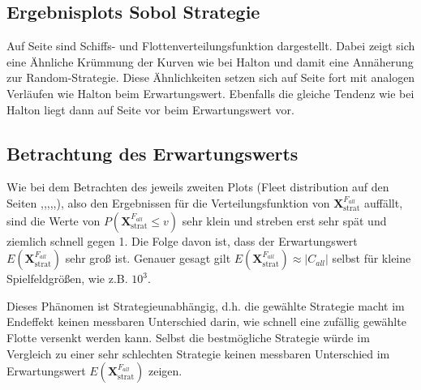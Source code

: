 \documentclass[a4paper,12pt]{llncs}
\numberwithin{equation}{section}
\DeclareMathOperator{\strat}{strat}
\begin{document}
\subsection{Ergebnisplots Sobol Strategie}

\begin{landscape}
	\label{fig:sobol1}
	
\end{landscape}

\begin{landscape}
	\label{fig:sobol2}
	
\end{landscape}

\begin{landscape}
	\label{fig:sobol3}
	
\end{landscape}

Auf Seite \pageref{fig:sobol1} sind Schiffs- und Flottenverteilungsfunktion dargestellt. Dabei zeigt sich eine Ähnliche Krümmung der Kurven wie bei Halton und damit eine Annäherung zur Random-Strategie. Diese Ähnlichkeiten setzen sich auf Seite \pageref{fig:sobol2} fort mit analogen Verläufen wie Halton beim Erwartungswert. Ebenfalls die gleiche Tendenz wie bei Halton liegt dann auf Seite \pageref{fig:sobol3} vor beim Erwartungswert vor.

\subsection{Betrachtung des Erwartungswerts}

Wie bei dem Betrachten des jeweils zweiten Plots (Fleet distribution auf den Seiten \pageref{fig:random1},\pageref{fig:fullGrid1},\pageref{fig:sparseGrid1},\pageref{fig:halton1},\pageref{fig:sobol1},\pageref{fig:compare1}), also den Ergebnissen für die Verteilungsfunktion von $\mathbf{X}^{F_{all}}_{\strat}$ auffällt, sind die Werte von $P(\mathbf{X}^{F_{all}}_{\strat} \leq v)$ sehr klein und streben erst sehr spät und ziemlich schnell gegen 1. Die Folge davon ist, dass der Erwartungswert $E(\mathbf{X}^{F_{all}}_{\strat})$ sehr groß ist. Genauer gesagt gilt $E(\mathbf{X}^{F_{all}}_{\strat}) \approx |C_{all}|$ selbst für kleine Spielfeldgrößen, wie z.B. $10^3$.

Dieses Phänomen ist Strategieunabhängig, d.h. die gewählte Strategie macht im Endeffekt keinen messbaren Unterschied darin, wie schnell eine zufällig gewählte Flotte versenkt werden kann. Selbst die bestmögliche Strategie würde im Vergleich zu einer sehr schlechten Strategie keinen messbaren Unterschied im Erwartungswert $E(\mathbf{X}^{F_{all}}_{\strat})$ zeigen.
\end{document}
